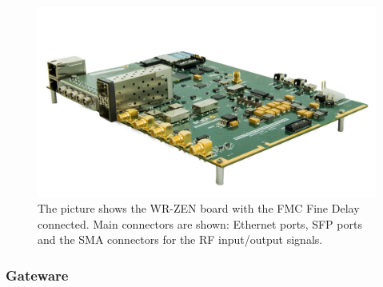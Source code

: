 \begin{figure}[H]
    \centering
    \includegraphics[width=0.7\linewidth]{img/wrzen}
    \caption[WR-ZEN board picture]{The picture shows the WR-ZEN board with the FMC Fine Delay connected. Main connectors are shown: Ethernet ports, SFP ports and the SMA connectors for the RF input/output signals.}
    \label{fig:wrzen}
\end{figure}


\subsubsection{Gateware}

%
%

